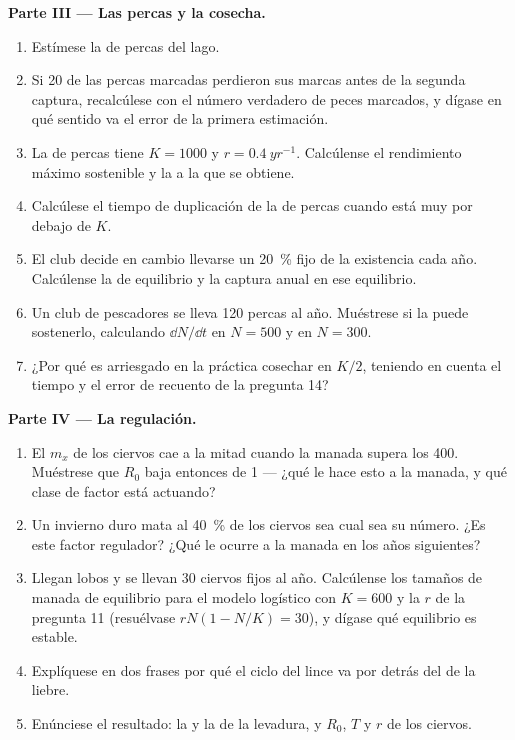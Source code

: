 \begin{problem}
\medskip
\noindent\textbf{Parte III --- Las percas y la cosecha.}
\begin{enumerate}[resume]
  \item Estímese la  de percas del lago.
  \item Si 20 de las percas marcadas perdieron sus marcas antes de la
        segunda captura, recalcúlese con el número verdadero de peces
        marcados, y dígase en qué sentido va el error de la primera
        estimación.
  \item La  de percas tiene $K = 1000$ y $r = \qty{0.4}{yr^{-1}}$.
        Calcúlense el rendimiento máximo sostenible y la  a la que
        se obtiene.
  \item Calcúlese el tiempo de duplicación de la  de percas cuando
        está muy por debajo de $K$.
  \item El club decide en cambio llevarse un \qty{20}{\%} fijo de la
        existencia cada año. Calcúlense la  de equilibrio y la
        captura anual en ese equilibrio.
  \item Un club de pescadores se lleva 120 percas al año. Muéstrese si la
         puede sostenerlo, calculando $\dd N/\dd t$ en $N =
        500$ y en $N = 300$.
  \item ¿Por qué es arriesgado en la práctica cosechar en $K/2$, teniendo en
        cuenta el tiempo y el error de recuento de la pregunta 14?
\end{enumerate}

\medskip
\noindent\textbf{Parte IV --- La regulación.}
\begin{enumerate}[resume]
  \item El $m_x$ de los ciervos cae a la mitad cuando la manada supera los
        400. Muéstrese que $R_0$ baja entonces de 1 --- ¿qué le hace esto a
        la manada, y qué clase de factor está actuando?
  \item Un invierno duro mata al \qty{40}{\%} de los ciervos sea cual sea su
        número. ¿Es este factor regulador? ¿Qué le ocurre a la manada en los
        años siguientes?
  \item Llegan lobos y se llevan 30 ciervos fijos al año. Calcúlense los
        tamaños de manada de equilibrio para el modelo logístico con
        $K = 600$ y la $r$ de la pregunta 11 (resuélvase $rN(1 - N/K) = 30$),
        y dígase qué equilibrio es estable.
  \item Explíquese en dos frases por qué el ciclo del lince va por detrás
        del de la liebre.
  \item Enúnciese el resultado: la  y la  de la levadura, y $R_0$, $T$ y $r$ de los ciervos.
\end{enumerate}
\end{problem}
